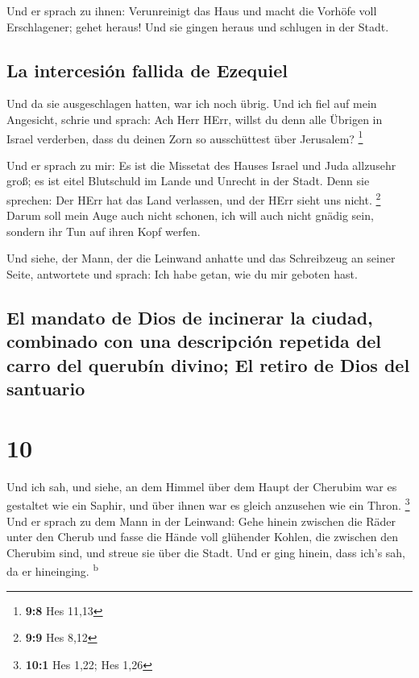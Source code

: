  Und er sprach zu ihnen: Verunreinigt das Haus und macht
die Vorhöfe voll Erschlagener; gehet heraus! Und sie gingen heraus und
schlugen in der Stadt.

\hypertarget{la-intercesiuxf3n-fallida-de-ezequiel}{%
\subsection{La intercesión fallida de
Ezequiel}\label{la-intercesiuxf3n-fallida-de-ezequiel}}

 Und da sie ausgeschlagen hatten, war ich noch übrig. Und
ich fiel auf mein Angesicht, schrie und sprach: Ach Herr HErr, willst du
denn alle Übrigen in Israel verderben, dass du deinen Zorn so
ausschüttest über Jerusalem? \footnote{\textbf{9:8} Hes 11,13}

 Und er sprach zu mir: Es ist die Missetat des Hauses
Israel und Juda allzusehr groß; es ist eitel Blutschuld im Lande und
Unrecht in der Stadt. Denn sie sprechen: Der HErr hat das Land
verlassen, und der HErr sieht uns nicht. \footnote{\textbf{9:9} Hes 8,12}
 Darum soll mein Auge auch nicht schonen, ich will auch
nicht gnädig sein, sondern ihr Tun auf ihren Kopf werfen.

 Und siehe, der Mann, der die Leinwand anhatte und das
Schreibzeug an seiner Seite, antwortete und sprach: Ich habe getan, wie
du mir geboten hast.

\hypertarget{el-mandato-de-dios-de-incinerar-la-ciudad-combinado-con-una-descripciuxf3n-repetida-del-carro-del-querubuxedn-divino-el-retiro-de-dios-del-santuario}{%
\subsection{El mandato de Dios de incinerar la ciudad, combinado con una
descripción repetida del carro del querubín divino; El retiro de Dios
del
santuario}\label{el-mandato-de-dios-de-incinerar-la-ciudad-combinado-con-una-descripciuxf3n-repetida-del-carro-del-querubuxedn-divino-el-retiro-de-dios-del-santuario}}

\hypertarget{section-9}{%
\section{10}\label{section-9}}

 Und ich sah, und siehe, an dem Himmel über dem Haupt der
Cherubim war es gestaltet wie ein Saphir, und über ihnen war es gleich
anzusehen wie ein Thron. \footnote{\textbf{10:1} Hes 1,22; Hes 1,26}
 Und er sprach zu dem Mann in der Leinwand: Gehe hinein
zwischen die Räder unter den Cherub und fasse die Hände voll glühender
Kohlen, die zwischen den Cherubim sind, und streue sie über die Stadt.
Und er ging hinein, dass ich's sah, da er hineinging.
\textsuperscript{b}

